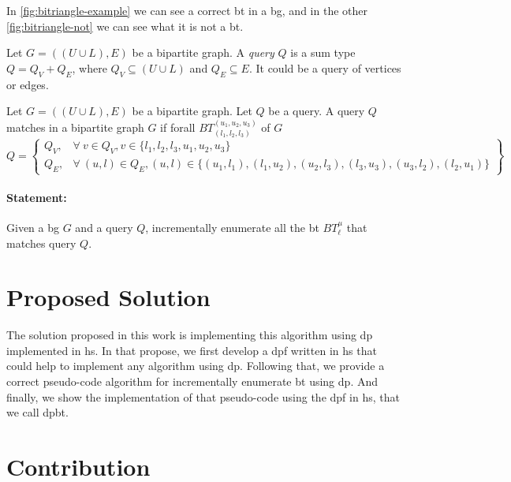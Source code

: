 

In \autoref{fig:bitriangle-example} we can see a correct \acrshort{bt} in a \acrshort{bg}, and in the other \autoref{fig:bitriangle-not} we can see what it is not a \acrshort{bt}.

\begin{definition}[Query]
Let $G=((U\cup L),E)$ be a bipartite graph. 
A \textit{query} $Q$ is a sum type $Q = Q_V + Q_E$, where $Q_V \subseteq (U \cup L)$ and $Q_E \subseteq E$. 
It could be a query of vertices or edges.
\end{definition}

\begin{definition}
  Let $G=((U\cup L),E)$ be a bipartite graph.
  Let $Q$ be a query.
  A query $Q$ matches in a bipartite graph $G$ if forall $BT_{(l_1,l_2,l_3)}^{(u_1,u_2,u_3)}$ of $G$
  \[
    Q = \left\{\begin{array}{lr}
      Q_V, & \forall\ v \in Q_V, v \in \{l_1,l_2,l_3,u_1,u_2,u_3\}\\
      Q_E, & \forall\ (u,l) \in Q_E, (u,l) \in \{(u_1, l_1), (l_1,u_2), (u_2, l_3), (l_3,u_3), (u_3, l_2), (l_2,u_1)\} 
      \end{array}\right\} 
  \]
  \end{definition}
  
\paragraph{Statement:}Given a \acrlong{bg} $G$ and a query $Q$, incrementally enumerate all the \acrlong{bt} $BT_{\ell}^{\mu}$ that matches query $Q$.

\section{Proposed Solution}
The solution proposed in this work is implementing this algorithm using \acrfull{dp} implemented in \acrfull{hs}.
In that propose, we first develop a \acrlong{dpf} written in \acrlong{hs} that could help to implement any algorithm using \acrshort{dp}.
Following that, we provide a correct pseudo-code algorithm for incrementally enumerate \acrshort{bt} using \acrshort{dp}. And finally, we  
show the implementation of that pseudo-code using the \acrshort{dpf} in \acrshort{hs}, that we call \acrfull{dpbt}.

\section{Contribution}

